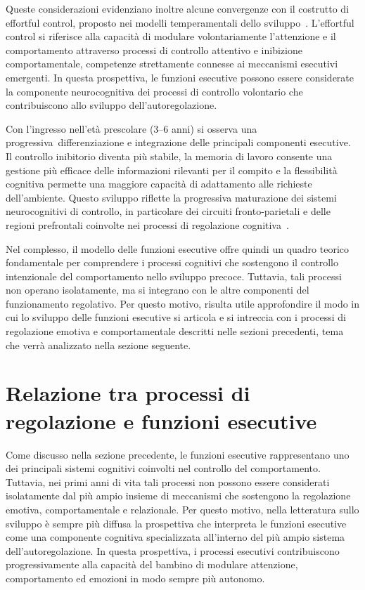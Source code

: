         Queste considerazioni evidenziano inoltre alcune convergenze con il costrutto di effortful control, proposto nei modelli temperamentali dello sviluppo~\cite{rothbart2006}. L'effortful control si riferisce alla capacità di modulare volontariamente l'attenzione e il comportamento attraverso processi di controllo attentivo e inibizione comportamentale, competenze strettamente connesse ai meccanismi esecutivi emergenti. In questa prospettiva, le funzioni esecutive possono essere considerate la componente neurocognitiva dei processi di controllo volontario che contribuiscono allo sviluppo dell'autoregolazione.

        Con l'ingresso nell'età prescolare (3--6 anni) si osserva una progressiva~differenziazione e integrazione delle principali componenti esecutive. Il controllo inibitorio diventa più stabile, la memoria di lavoro consente una gestione più efficace delle informazioni rilevanti per il compito e la flessibilità cognitiva permette una maggiore capacità di adattamento alle richieste dell'ambiente. Questo sviluppo riflette la progressiva maturazione dei sistemi neurocognitivi di controllo, in particolare dei circuiti fronto-parietali e delle regioni prefrontali coinvolte nei processi di regolazione cognitiva~\cite{diamond2013,blair2015}.

        Nel complesso, il modello delle funzioni esecutive offre quindi un quadro teorico fondamentale per comprendere i processi cognitivi che sostengono il controllo intenzionale del comportamento nello sviluppo precoce. Tuttavia, tali processi non operano isolatamente, ma si integrano con le altre componenti del funzionamento regolativo. Per questo motivo, risulta utile approfondire il modo in cui lo sviluppo delle funzioni esecutive si articola e si intreccia con i processi di regolazione emotiva e comportamentale descritti nelle sezioni precedenti, tema che verrà analizzato nella sezione seguente.

    \section{Relazione tra processi di regolazione e funzioni esecutive}
    \label{sec:1_5}

        Come discusso nella sezione precedente, le funzioni esecutive rappresentano uno dei principali sistemi cognitivi coinvolti nel controllo del comportamento. Tuttavia, nei primi anni di vita tali processi non possono essere considerati isolatamente dal più ampio insieme di meccanismi che sostengono la regolazione emotiva, comportamentale e relazionale. Per questo motivo, nella letteratura sullo sviluppo è sempre più diffusa la prospettiva che interpreta le funzioni esecutive come una componente cognitiva specializzata all'interno del più ampio sistema dell'autoregolazione. In questa prospettiva, i processi esecutivi contribuiscono progressivamente alla capacità del bambino di modulare attenzione, comportamento ed emozioni in modo sempre più autonomo.

